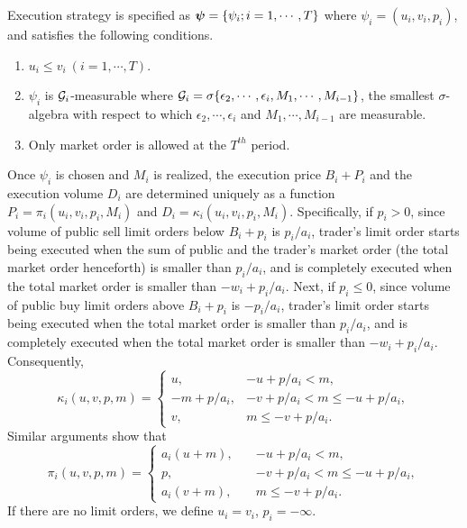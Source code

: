 \begin{assumption}\label{ass_l2}
 \quad Execution strategy is specified as $\mbox{\boldmath $\psi$} = \{ \psi_i ; i=1,\cdots,T \}$ where $\psi_i = (u_i, v_i, p_i)$, and satisfies the following conditions.
 \begin{enumerate}
  \item $u_i \leq v_i\ (i=1,\cdots,T)$.
  \item $\psi_i$ is ${\cal G}_i$-measurable where ${\cal G}_i = \sigma \{ \epsilon_2, \cdots, \epsilon_i, M_1, \cdots, M_{i-1} \}$, the smallest $\sigma$-algebra with respect to which $\epsilon_2, \cdots, \epsilon_i$ and $M_1, \cdots, M_{i-1}$ are measurable.
  \item Only market order is allowed at the $T^{th}$ period.
 \end{enumerate}
\end{assumption}

Once $\psi_i$ is chosen and $M_i$ is realized, the execution price $B_i+P_i$ and the execution volume $D_i$ are determined uniquely as a function $P_i=\pi_i(u_i,v_i,p_i,M_i)$ and $D_i=\kappa_i(u_i,v_i,p_i,M_i)$.  Specifically, if $p_i > 0$, since volume of public sell limit orders below $B_i+p_i$ is $p_i/a_i$, trader's limit order starts being executed when the sum of public and the trader's market order (the total market order henceforth) is smaller than $p_i/a_i$, and is completely executed when the total market order is smaller than $-w_i+p_i/a_i$.  Next, if $p_i \leq 0$, since volume of public buy limit orders above $B_i+p_i$ is $-p_i/a_i$, trader's limit order starts being executed when the total market order is smaller than $p_i/a_i$, and is completely executed when the total market order is smaller than $-w_i+p_i/a_i$.  Consequently, 
\begin{equation}\label{eq_l7}
  \kappa_i(u,v,p,m) = \left\{
  \begin{array}{ll}
   u, \quad & -u + p/a_i < m, \\
   -m+p/a_i, & -v+p/a_i < m \leq -u + p/a_i, \\
   v, & m \leq -v + p/a_i.
  \end{array}
  \right.
\end{equation}
Similar arguments show that 
\begin{equation}\label{eq_l8}
  \pi_i(u,v,p,m) = \left\{
  \begin{array}{ll}
   a_i(u+m), \quad & -u + p/a_i < m, \\
   p, & -v+p/a_i < m \leq -u + p/a_i, \\
   a_i(v+m), & m \leq -v + p/a_i.
  \end{array}
  \right.
\end{equation}
If there are no limit orders, we define $u_i=v_i$, $p_i=-\infty$.

